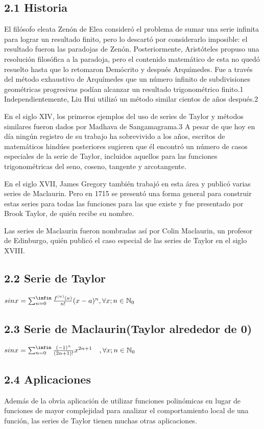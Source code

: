 \documentclass[spanish,a4paper,10pt]{article}
\begin{document}
\subsection{\bf 2.1 Historia}
El filósofo eleata Zenón de Elea consideró el problema de sumar una serie infinita para lograr un resultado finito, pero lo descartó por considerarlo imposible: el resultado fueron las paradojas de Zenón. Posteriormente, Aristóteles propuso una resolución filosófica a la paradoja, pero el contenido matemático de esta no quedó resuelto hasta que lo retomaron Demócrito y después Arquímedes. Fue a través del método exhaustivo de Arquímedes que un número infinito de subdivisiones geométricas progresivas podían alcanzar un resultado trigonométrico finito.1 Independientemente, Liu Hui utilizó un método similar cientos de años después.2

En el siglo XIV, los primeros ejemplos del uso de series de Taylor y métodos similares fueron dados por Madhava de Sangamagrama.3 A pesar de que hoy en día ningún registro de su trabajo ha sobrevivido a los años, escritos de matemáticos hindúes posteriores sugieren que él encontró un número de casos especiales de la serie de Taylor, incluidos aquellos para las funciones trigonométricas del seno, coseno, tangente y arcotangente.

En el siglo XVII, James Gregory también trabajó en esta área y publicó varias series de Maclaurin. Pero en 1715 se presentó una forma general para construir estas series para todas las funciones para las que existe y fue presentado por Brook Taylor, de quién recibe su nombre.

Las series de Maclaurin fueron nombradas así por Colin Maclaurin, un profesor de Edinburgo, quién publicó el caso especial de las series de Taylor en el siglo XVIII.
\subsection{\bf 2.2 Serie de Taylor}
    $sin x = \sum_{n=0}^{\infin} \frac{f^{(n)}(a)}{n!} (x-a)^{n}, \forall x; n \in \mathbb{N}_0 $ 
\subsection{2.3 Serie de Maclaurin(Taylor alrededor de 0)}
    $sin x = \sum^{\infin}_{n=0} \frac{(-1)^n}{(2n+1)!} x^{2n+1}\quad, \forall x; n \in \mathbb{N}_0 $
\subsection{\bf 2.4 Aplicaciones}    
Además de la obvia aplicación de utilizar funciones polinómicas en lugar de funciones de mayor complejidad para analizar el comportamiento local de una función, las series de Taylor tienen muchas otras aplicaciones.
\end{document}

